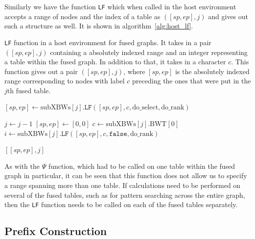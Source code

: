 \documentclass[a4paper,12pt,twoside,BCOR=10mm]{scrbook}
\begin{document}
Similarly we have the function \texttt{LF} which when called in the host environment accepts a range of nodes
and the index of a table as $ ([sp, ep], j) $ and gives out such a structure as well.
It is shown in algorithm~\ref{alg:host_lf}.
\begin{algorithm}
\caption[\texttt{LF} function in a host environment for fused graphs]{\texttt{LF} function in a host environment for fused graphs. It takes in a pair $ ([sp, ep], j) $ containing a absolutely indexed range and an integer representing a table within the fused graph. In addition to that, it takes in a character $ c $. This function gives out a pair $ ([sp, ep], j) $, where $ [sp, ep] $ is the absolutely indexed range corresponding to nodes with label $ c $ preceding the ones that were put in the $ j $th fused table.}
\label{alg:host_lf}
\begin{algorithmic}[1]

\State $ [sp, ep] \gets \textrm{subXBWs}[ j ].\texttt{LF}( [sp, ep], c, \textrm{do\_select}, \textrm{do\_rank} ) $

\State \phantom{nl}

	\State $ j \gets j - 1 $
	\State $ [ sp, ep ] \gets [ 0, 0 ] $
	\State $ c \gets \textrm{subXBWs}[ j ].\textrm{BWT}[ 0 ] $
	\State $ i \gets \textrm{subXBWs}[ j ].\texttt{LF}( [sp, ep], c, \texttt{false}, \textrm{do\_rank} ) $
\EndIf

\State \phantom{nl}

\State \Return $ [ [sp, ep], j ] $

\end{algorithmic}
\end{algorithm}
As with the $\Psi$ function, which had to be called on one table within the fused graph in particular,
it can be seen that this function does not allow us to specify a range spanning more
than one table. If calculations need to be performed on
several of the fused tables, such as for pattern searching across the entire graph,
then the \texttt{LF} function needs to be called on each of the fused tables separately.

\subsection{Prefix Construction}
\end{document}
